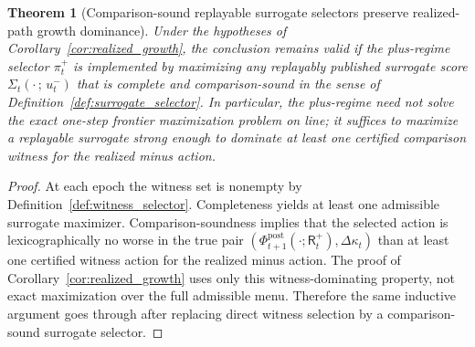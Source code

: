 \documentclass[11pt]{article}
\newtheorem{theorem}{Theorem}[section]
\theoremstyle{definition}
\newcommand{\1}{\mathbf{1}}
\begin{document}
\begin{theorem}[Comparison-sound replayable surrogate selectors preserve realized-path growth dominance]\label{thm:surrogate_realized_growth}
Under the hypotheses of Corollary~\ref{cor:realized_growth}, the conclusion remains valid if the plus-regime selector $\pi_t^+$ is implemented by maximizing any replayably published surrogate score $\Sigma_t(\cdot\,;\,u_t^-)$ that is complete and comparison-sound in the sense of Definition~\ref{def:surrogate_selector}. In particular, the plus-regime need not solve the exact one-step frontier maximization problem on line; it suffices to maximize a replayable surrogate strong enough to dominate at least one certified comparison witness for the realized minus action.
\end{theorem}

\begin{proof}
At each epoch the witness set is nonempty by Definition~\ref{def:witness_selector}. Completeness yields at least one admissible surrogate maximizer. Comparison-soundness implies that the selected action is lexicographically no worse in the true pair $(\Phi_{t+1}^{\mathrm{post}}(\cdot;\mathsf R_t^+),\Delta\kappa_t)$ than at least one certified witness action for the realized minus action. The proof of Corollary~\ref{cor:realized_growth} uses only this witness-dominating property, not exact maximization over the full admissible menu. Therefore the same inductive argument goes through after replacing direct witness selection by a comparison-sound surrogate selector.
\end{proof}
\end{document}
